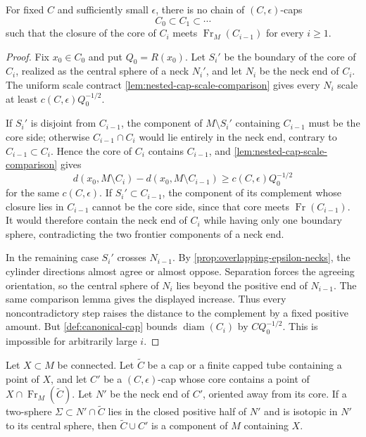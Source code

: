 \begin{lemma}
\label{lem:no-infinite-nested-canonical-caps}
\notready
For fixed $C$ and sufficiently small $\epsilon$, there is no chain of
$(C,\epsilon)$-caps
\[
 C_0\subset C_1\subset\cdots
\]
such that the closure of the core of $C_i$ meets
$\operatorname{Fr}_M(C_{i-1})$ for every $i\ge1$.
\end{lemma}

\begin{proof}
Fix $x_0\in C_0$ and put $Q_0=R(x_0)$.  Let $S_i'$ be the boundary of
the core of $C_i$, realized as the central sphere of a neck $N_i'$, and
let $N_i$ be the neck end of $C_i$.  The uniform scale contract
\ref{lem:nested-cap-scale-comparison} gives every $N_i$ scale at least
$c(C,\epsilon)Q_0^{-1/2}$.

If $S_i'$ is disjoint from $C_{i-1}$, the component of
$M\setminus S_i'$ containing $C_{i-1}$ must be the core side; otherwise
$C_{i-1}\cap C_i$ would lie entirely in the neck end, contrary to
$C_{i-1}\subset C_i$.  Hence the core of $C_i$ contains $C_{i-1}$, and
\ref{lem:nested-cap-scale-comparison} gives
\[
 d(x_0,M\setminus C_i)-d(x_0,M\setminus C_{i-1})
  \ge c(C,\epsilon)Q_0^{-1/2}
\]
for the same $c(C,\epsilon)$.  If $S_i'\subset C_{i-1}$, the component of its
complement whose closure lies in $C_{i-1}$ cannot be the core side, since
that core meets $\operatorname{Fr}(C_{i-1})$.  It would therefore contain
the neck end of $C_i$ while having only one boundary sphere, contradicting
the two frontier components of a neck end.

In the remaining case $S_i'$ crosses $N_{i-1}$.
By \ref{prop:overlapping-epsilon-necks}, the cylinder directions almost
agree or almost oppose.  Separation forces the agreeing orientation, so
the central sphere of $N_i$ lies beyond the positive end of $N_{i-1}$.
  The same comparison lemma gives the displayed increase.  Thus every
noncontradictory step raises the distance to the complement by a fixed
positive amount.  But \ref{def:canonical-cap} bounds
$\operatorname{diam}(C_i)$ by $CQ_0^{-1/2}$.  This is impossible for
arbitrarily large $i$.
\end{proof}

\begin{lemma}
\label{lem:isotopic-cap-gluing-sphere}
\notready
Let $X\subset M$ be connected.  Let $\widetilde C$ be a cap or a finite
capped tube containing a point of $X$, and let $C'$ be a
$(C,\epsilon)$-cap whose core contains a point of
$X\cap\operatorname{Fr}_M(\widetilde C)$.  Let $N'$ be the neck end of
$C'$, oriented away from its core.  If a two-sphere
$\Sigma\subset N'\cap\widetilde C$ lies in the closed positive half of
$N'$ and is isotopic in $N'$ to its central sphere, then
$\widetilde C\cup C'$ is a component of $M$ containing $X$.
\end{lemma}

